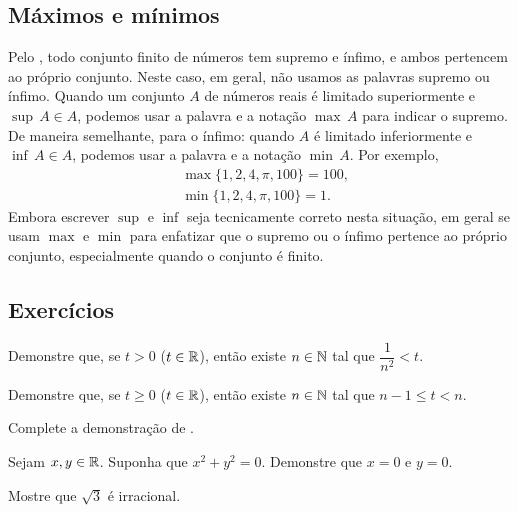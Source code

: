 \subsection{Máximos e mínimos}

Pelo ,
todo conjunto finito de números tem supremo e ínfimo,
e ambos pertencem ao próprio conjunto.
Neste caso, em geral, não usamos as palavras supremo ou ínfimo.
Quando um conjunto $A$ de números reais é limitado superiormente e
$\sup\, A \in A$, podemos usar a palavra
\emph{} e a notação $\max\, A$ para indicar o supremo.
De maneira semelhante, para o ínfimo: quando $A$ é limitado inferiormente
e $\inf\, A \in A$, podemos usar a
palavra \emph{} e a notação $\min\, A$.
Por exemplo,
\begin{align*}
& \max \{ 1,2{,}4,\pi,100 \} = 100 , \\
& \min \{ 1,2{,}4,\pi,100 \} = 1 .
\end{align*}
Embora escrever $\sup$ e $\inf$ seja tecnicamente
correto nesta situação, em geral se usam $\max$ e
$\min$ para enfatizar que o supremo ou o ínfimo
pertence ao próprio conjunto, especialmente quando o conjunto é finito.

\subsection{Exercícios}

\begin{exercise}
Demonstre que,
se $t > 0$ ($t \in {\mathbb{R}}$), então existe $n \in {\mathbb{N}}$ tal que
$\dfrac{1}{n^2} < t$.
\end{exercise}

\begin{exercise}
Demonstre que,
se $t \geq 0$ ($t \in {\mathbb{R}}$), então existe $n \in {\mathbb{N}}$ tal que $n-1 \leq t < n$.
\end{exercise}

\begin{exercise}
Complete a demonstração de .
\end{exercise}

\begin{exercise}
Sejam $x, y \in {\mathbb{R}}$. Suponha que $x^2 + y^2 = 0$. Demonstre que $x = 0$ e $y = 0$.
\end{exercise}

\begin{exercise}
Mostre que $\sqrt{3}$ é irracional.
\end{exercise}

